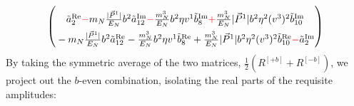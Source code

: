 \begin{align}
\begin{pmatrix}
      \rule{0pt}{16pt}  \tilde a^{\text{Re}}_2 \textcolor{red}{-}  \mN  \frac{|\vec{P}^1|}{E_N} \bvec^2  \tilde a^{\text{Im}}_{12}\textcolor{red}{-} \frac{  \mN^3}{E_N}  \bvec^2 \eta v^1  \tilde b^{\text{Im}}_8\textcolor{red}{+} \frac{ \mN^3}{E_N}  |\vec{P}^1| \bvec^2 \eta^2 (v^3)^2 \tilde b^{\text{Im}}_{10}\\
      \rule{0pt}{16pt} - \mN  \frac{|\vec{P}^1|}{E_N} \bvec^2  \tilde a^{\text{Re}}_{12}- \frac{  \mN^3}{E_N}  \bvec^2 \eta v^1  \tilde b^{\text{Re}}_8 + \frac{ \mN^3}{E_N}  |\vec{P}^1| \bvec^2 \eta^2 (v^3)^2 \tilde b^{\text{Re}}_{10}\textcolor{red}{-}\tilde a^{\text{Im}}_2
    \end{pmatrix}
\end{align}
By taking the symmetric average of the two matrices, $\frac{1}{2}\left(R^{[+b]} + R^{[-b]}\right)$, we project out the $b$-even combination, isolating the real parts of the requisite amplitudes:
